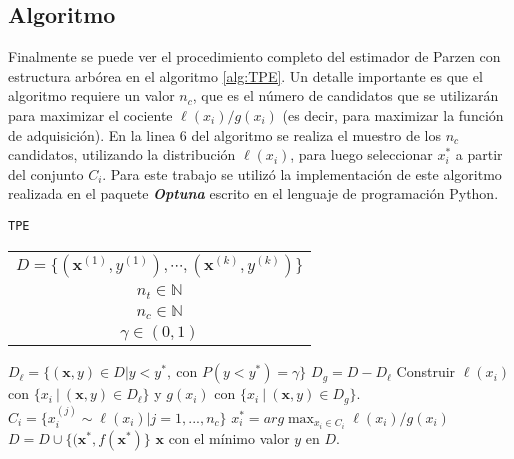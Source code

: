 
\subsection*{Algoritmo}

Finalmente se puede ver el procedimiento completo del estimador de Parzen con estructura arbórea en el algoritmo \ref{alg:TPE}. Un detalle importante es que el algoritmo requiere un valor $n_c$, que es el número de candidatos que se utilizarán para maximizar el cociente $\ell(x_i)/g(x_i)$ (es decir, para maximizar la función de adquisición). En la linea 6 del algoritmo se realiza el muestro de los $n_c$ candidatos, utilizando la distribución $\ell(x_i)$, para luego seleccionar $x_i^*$ a partir del conjunto $C_i$.
Para este trabajo se utilizó la implementación de este algoritmo realizada en el paquete \textbf{\textit{Optuna}} \cite{optuna_2019} escrito en el lenguaje de programación Python.

\begin{algorithm}
\caption{\texttt{TPE}}
\label{alg:TPE}
\begin{algorithmic}[1]
\Require
\begin{tabular}{c}
$D = \{(\textbf{x}^{(1)},y^{(1)}), \cdots, (\textbf{x}^{(k)},y^{(k)}) \}$ \Comment{Observaciones}  \\ 
$n_t \in \mathbb{N}$ \Comment{número de iteraciones} \\ 
$n_c \in \mathbb{N}$ \Comment{número de candidatos} \\
$\gamma \in (0,1) $ \Comment{cuantil para obtener $y^*$}
\end{tabular} 

\vspace{1mm}
	\State $D_{\ell} = \{ (\textbf{x}, y) \in D | y < y^*, \ \text{con } P(y<y^*) = \gamma  \}$
	\State $D_g = D - D_{\ell}$
	 
		\State Construir $\ell(x_i)$ con $\{x_i \ | \ (\textbf{x}, y) \in D_{\ell}\}$ y $g(x_i)$ con $\{x_i \ | \ (\textbf{x}, y) \in D_g \}$.
		\State $C_i = \{ x_i^{(j)} \sim \ell(x_i)| j=1, ..., n_c \}$ 
		\State $x_{i}^* = arg \max_{x_i\in C_i} \ell(x_i)/g(x_i)$
	\EndFor
	\State $D = D \cup \{(\textbf{x}^*, f(\textbf{x}^*)\}$ 
\EndFor
\Ensure $\textbf{x}$ con el mínimo valor $y$ en $D$.
\vspace{3mm}

\end{algorithmic}
\end{algorithm}
 
